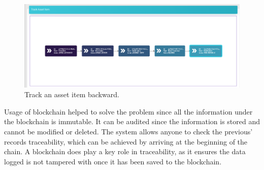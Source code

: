 \begin{figure}[H]
\begin{center}
  \includegraphics[scale=0.375]{images/use_example/trackbackwards.png}
\caption{Track an asset item backward.}
\label{fig:track_asset_item}
\end{center}
\end{figure}

Usage of blockchain helped to solve the problem since all the information under the blockchain is immutable. It can be audited since the information is stored and cannot be modified or deleted. The system allows anyone to check the previous' records traceability, which can be achieved by arriving at the beginning of the chain. A blockchain does play a key role in traceability, as it ensures the data logged is not tampered with once it has been saved to the blockchain.
 
 
 
 
 
